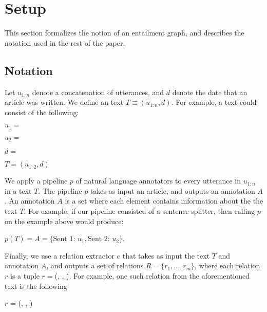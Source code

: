\section{Setup}
This section formalizes the notion of an entailment graph, and describes
the notation used in the rest of the paper.
\subsection{Notation}
Let $u_{1:n}$ denote a concatenation of utterances, and 
$d$ denote the date that an article was written. We define
an text $T \equiv (u_{1:n}, d)$. For example, a text could consist
of the following:
\begin{description}

  \item $u_1 =$ 
  \item $u_2 =$ 
  \item $d =$  
  \item $T = (u_{1:2}, d)$
\end{description}

We apply a pipeline $p$ of natural language annotators 
to every utterance in $u_{1:n}$ in a text $T$. 
The pipeline $p$ takes as input an article, and outputs an annotation $A$.
An annotation $A$ is a set where each element contains
information about the the text $T$. For example, if our
pipeline consisted of a sentence splitter, then calling $p$
on the example above would produce:
\begin{center}
  $p(T) = A = \{\text{Sent 1: } u_1, \text{Sent 2: } u_2\}$.
\end{center}

Finally, we use a relation extractor $e$ that takes as input
the text $T$ and annotation $A$, and outputs a set of relations $R=\{r_1,\dots,r_m\}$,
where each relation $r$ is a tuple $r=$(, , ).
For example, one such relation from the aforementioned text is the following
\begin{center}
  $r$ = (, , )
\end{center}

